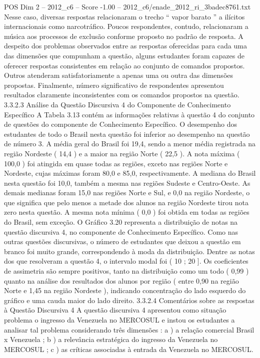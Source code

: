 \begin{textsample}{POS Dim 2 – 2012\_c6 – Score -1.00 – 2012\_c6/enade\_2012\_ri\_3badec8761.txt}
Nesse caso, diversas respostas relacionaram o trecho “ vapor barato ” a ilícitos internacionais como narcotráfico.
Poucos respondentes, contudo, relacionaram a música aos processos de exclusão conforme proposto no padrão de resposta.
A despeito dos problemas observados entre as respostas oferecidas para cada uma das dimensões que compunham a questão, alguns estudantes foram capazes de oferecer respostas consistentes em relação ao conjunto de comandos propostos.
Outros atenderam satisfatoriamente a apenas uma ou outra das dimensões propostas.
Finalmente, número significativo de respondentes apresentou resultados claramente inconsistentes com os comandos propostos na questão. 3.3.2.3 Análise da Questão Discursiva 4 do Componente de Conhecimento Específico A Tabela 3.13 contém as informações relativas à questão 4 do conjunto de questões do componente de Conhecimento Específico.
O desempenho dos estudantes de todo o Brasil nesta questão foi inferior ao desempenho na questão de número 3.
A média geral do Brasil foi 19,4, sendo a menor média registrada na região Nordeste ( 14,4 ) e a maior na região Norte ( 22,5 ).
A nota máxima ( 100,0 ) foi atingida em quase todas as regiões, exceto nas regiões Norte e Nordeste, cujas máximas foram 80,0 e 85,0, respectivamente.
A mediana do Brasil nesta questão foi 10,0, também a mesma nas regiões Sudeste e Centro-Oeste.
As demais medianas foram 15,0 nas regiões Norte e Sul, e 0,0 na região Nordeste, o que significa que pelo menos a metade dos alunos na região Nordeste tirou nota zero nesta questão.
A mesma nota mínima ( 0,0 ) foi obtida em todas as regiões do Brasil, sem exceção.
O Gráfico 3.20 representa a distribuição de notas na questão discursiva 4, no componente de Conhecimento Específico.
Como nas outras questões discursivas, o número de estudantes que deixou a questão em branco foi muito grande, correspondendo à moda da distribuição.
Dentre as notas dos que resolveram a questão 4, o intervalo modal foi ( 10 ; 20 ].
Os coeficientes de assimetria são sempre positivos, tanto na distribuição como um todo ( 0,99 ) quanto na análise dos resultados dos alunos por região ( entre 0,90 na região Norte e 1,45 na região Nordeste ), indicando concentração do lado esquerdo do gráfico e uma cauda maior do lado direito. 3.3.2.4 Comentários sobre as respostas à Questão Discursiva 4 A questão discursiva 4 apresentou como situação problema o ingresso da Venezuela no MERCOSUL e instou os estudantes a analisar tal problema considerando três dimensões : a ) a relação comercial Brasil x Venezuela ; b ) a relevância estratégica do ingresso da Venezuela no MERCOSUL ; c ) as críticas associadas à entrada da Venezuela no MERCOSUL.

\end{textsample}
